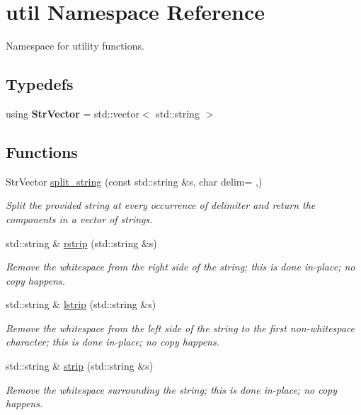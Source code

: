 \hypertarget{namespaceutil}{}\section{util Namespace Reference}
\label{namespaceutil}


Namespace for utility functions.  


\subsection*{Typedefs}
\begin{DoxyCompactItemize}
\item 
using {\bfseries Str\+Vector} = std\+::vector$<$ std\+::string $>$\hypertarget{namespaceutil_ade77d5ddac1eaaad1bba55987e71a4d7}{}\label{namespaceutil_ade77d5ddac1eaaad1bba55987e71a4d7}

\end{DoxyCompactItemize}
\subsection*{Functions}
\begin{DoxyCompactItemize}
\item 
Str\+Vector \hyperlink{namespaceutil_aa854bf66d010486b1cbb1e0ee63eb6f3}{split\+\_\+string} (const std\+::string \&s, char delim= \textquotesingle{},\textquotesingle{})
\begin{DoxyCompactList}\small\item\em Split the provided string at every occurrence of delimiter and return the components in a vector of strings. \end{DoxyCompactList}\item 
std\+::string \& \hyperlink{namespaceutil_a8119e330269073c45052eff3685a2aee}{rstrip} (std\+::string \&s)
\begin{DoxyCompactList}\small\item\em Remove the whitespace from the right side of the string; this is done in-\/place; no copy happens. \end{DoxyCompactList}\item 
std\+::string \& \hyperlink{namespaceutil_a153364ee5c66d54d28f697ac2497fad7}{lstrip} (std\+::string \&s)
\begin{DoxyCompactList}\small\item\em Remove the whitespace from the left side of the string to the first non-\/whitespace character; this is done in-\/place; no copy happens. \end{DoxyCompactList}\item 
std\+::string \& \hyperlink{namespaceutil_a3449c39263dedd9264e2db8ceb706f81}{strip} (std\+::string \&s)
\begin{DoxyCompactList}\small\item\em Remove the whitespace surrounding the string; this is done in-\/place; no copy happens. \end{DoxyCompactList}\end{DoxyCompactItemize}
